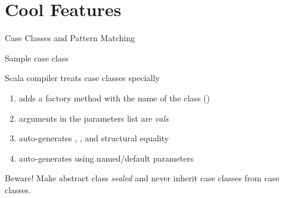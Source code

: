 \documentclass[serif,t,11pt]{beamer}
\begin{document}
\section{Cool Features}

\begin{frame}{Case Classes and Pattern Matching}
\begin{exampleblock}{Sample case class}

\end{exampleblock}

\pause

\begin{alertblock}{Scala compiler treats case classes specially}
\begin{enumerate}
\item adds a factory method with the name of the class ()
\item arguments in the parameters list are \emph{vals}
\item auto-generates , , and structural equality
\item auto-generates  using named/default parameters
\end{enumerate}
\end{alertblock}

\pause

\begin{alertblock}{Beware!}
Make abstract class \emph{sealed} and never inherit case classes from case classes.
\end{alertblock}

\end{frame}
\end{document}
